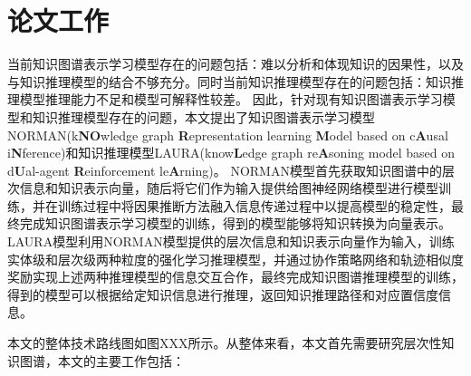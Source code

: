 \documentclass[algorithmlist, AutoFakeBold, AutoFakeSlant, figurelist, tablelist, nomlist, masters]{seuthesix}
\begin{document}
\section{论文工作}
当前知识图谱表示学习模型存在的问题包括：难以分析和体现知识的因果性，以及与知识推理模型的结合不够充分。同时当前知识推理模型存在的问题包括：知识推理模型推理能力不足和模型可解释性较差。
因此，针对现有知识图谱表示学习模型和知识推理模型存在的问题，本文提出了知识图谱表示学习模型NORMAN(k\textbf{NO}wledge graph \textbf{R}epresentation learning \textbf{M}odel based on c\textbf{A}usal i\textbf{N}ference)和知识推理模型LAURA(know\textbf{L}edge graph re\textbf{A}soning model based on d\textbf{U}al-agent \textbf{R}einforcement le\textbf{A}rning)。
NORMAN模型首先获取知识图谱中的层次信息和知识表示向量，随后将它们作为输入提供给图神经网络模型进行模型训练，并在训练过程中将因果推断方法融入信息传递过程中以提高模型的稳定性，最终完成知识图谱表示学习模型的训练，得到的模型能够将知识转换为向量表示。
LAURA模型利用NORMAN模型提供的层次信息和知识表示向量作为输入，训练实体级和层次级两种粒度的强化学习推理模型，并通过协作策略网络和轨迹相似度奖励实现上述两种推理模型的信息交互合作，最终完成知识图谱推理模型的训练，得到的模型可以根据给定知识信息进行推理，返回知识推理路径和对应置信度信息。

本文的整体技术路线图如图XXX所示。从整体来看，本文首先需要研究层次性知识图谱，本文的主要工作包括：
\end{document}
